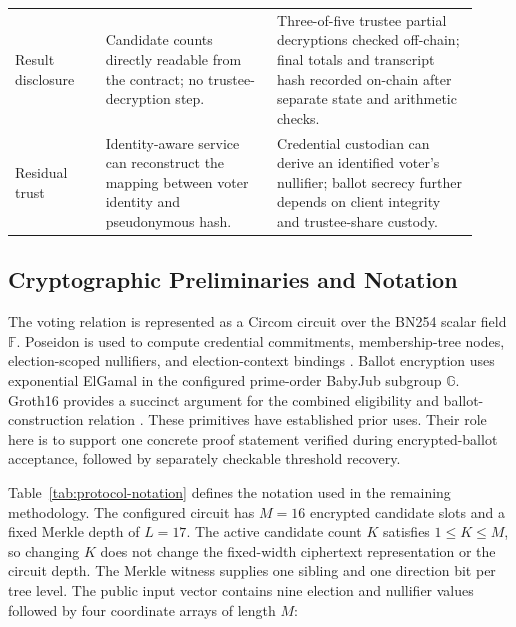 \begin{table}[tbp]
\begin{tabular}{@{}>{\raggedright\arraybackslash}p{0.18\linewidth}>{\raggedright\arraybackslash}p{0.34\linewidth}>{\raggedright\arraybackslash}p{0.40\linewidth}@{}}
\addlinespace[3pt]
Result disclosure &
Candidate counts directly readable from the contract; no trustee-decryption step. &
Three-of-five trustee partial decryptions checked off-chain; final totals and transcript hash recorded on-chain after separate state and arithmetic checks. \\
\addlinespace[3pt]
Residual trust &
Identity-aware service can reconstruct the mapping between voter identity and pseudonymous hash. &
Credential custodian can derive an identified voter's nullifier; ballot secrecy further depends on client integrity and trustee-share custody. \\
\bottomrule
\end{tabular}
\end{table}

\subsection{Cryptographic Preliminaries and Notation}
\label{subsec:protocol-notation}
\label{sec:05}
\label{sec:cryptographic-protocol}

The voting relation is represented as a Circom circuit over the BN254
scalar field $\mathbb{F}$. Poseidon is used to compute credential
commitments, membership-tree nodes, election-scoped nullifiers, and
election-context bindings \citep{grassi2021poseidon}. Ballot encryption
uses exponential ElGamal in the configured prime-order BabyJub subgroup
$\mathbb{G}$. Groth16 provides a succinct argument for the combined
eligibility and ballot-construction relation
\citep{groth2016snark}. These primitives have established prior uses.
Their role here is to support one concrete proof statement verified
during encrypted-ballot acceptance, followed by separately checkable
threshold recovery.

Table~\ref{tab:protocol-notation} defines the notation used in the
remaining methodology. The configured circuit has $M=16$ encrypted
candidate slots and a fixed Merkle depth of $L=17$. The active
candidate count $K$ satisfies $1\leq K\leq M$, so changing $K$ does not
change the fixed-width ciphertext representation or the circuit depth.
The Merkle witness supplies one sibling and one direction bit per
tree level. The public input vector contains nine election and nullifier
values followed by four coordinate arrays of length $M$:


